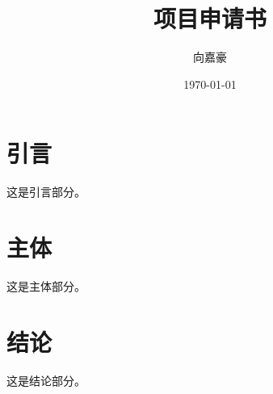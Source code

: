 \documentclass{ctexart}
\begin{document}
\title{项目申请书}
\author{向嘉豪}
\date{\today}

\maketitle


\section{引言}
这是引言部分。

\section{主体}
这是主体部分。

\section{结论}
这是结论部分。
\end{document}
